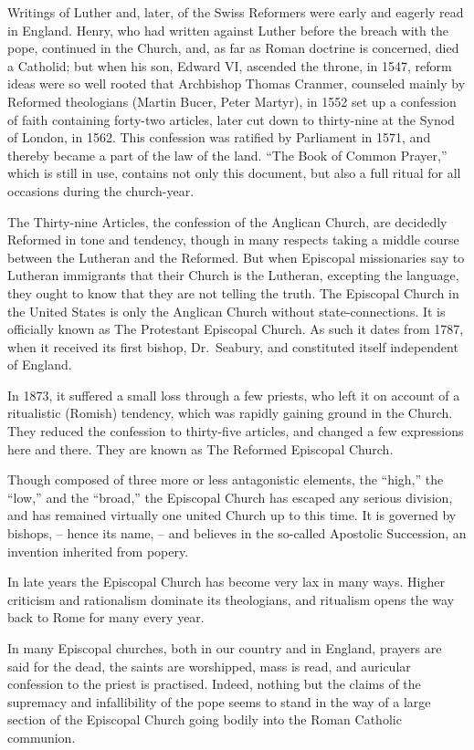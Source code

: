 \documentclass[
]{book}
\begin{document}
Writings of Luther and, later, of the Swiss Reformers were early and eagerly read in England. Henry, who had written against Luther before the breach with the pope, continued in the Church, and, as far as Roman doctrine is concerned, died a Catholid; but when his son, Edward VI, ascended the throne, in 1547, reform ideas were so well rooted that Archbishop Thomas Cranmer, counseled mainly by Reformed theologians (Martin Bucer, Peter Martyr), in 1552 set up a confession of faith containing forty-two articles, later cut down to thirty-nine at the Synod of London, in 1562. This confession was ratified by Parliament in 1571, and thereby became a part of the law of the land. ``The Book of Common Prayer,'' which is still in use, contains not only this document, but also a full ritual for all occasions during the church-year.

The Thirty-nine Articles, the confession of the Anglican Church, are decidedly Reformed in tone and tendency, though in many respects taking a middle course between the Lutheran and the Reformed. But when Episcopal missionaries say to Lutheran immigrants that their Church is the Lutheran, excepting the language, they ought to know that they are not telling the truth. The Episcopal Church in the United States is only the Anglican Church without state-connections. It is officially known as The Protestant Episcopal Church. As such it dates from 1787, when it received its first bishop, Dr.~Seabury, and constituted itself independent of England.

In 1873, it suffered a small loss through a few priests, who left it on account of a ritualistic (Romish) tendency, which was rapidly gaining ground in the Church. They reduced the confession to thirty-five articles, and changed a few expressions here and there. They are known as The Reformed Episcopal Church.

Though composed of three more or less antagonistic elements, the ``high,'' the ``low,'' and the ``broad,'' the Episcopal Church has escaped any serious division, and has remained virtually one united Church up to this time. It is governed by bishops, -- hence its name, -- and believes in the so-called Apostolic Succession, an invention inherited from popery.

In late years the Episcopal Church has become very lax in many ways. Higher criticism and rationalism dominate its theologians, and ritualism opens the way back to Rome for many every year.

In many Episcopal churches, both in our country and in England, prayers are said for the dead, the saints are worshipped, mass is read, and auricular confession to the priest is practised. Indeed, nothing but the claims of the supremacy and infallibility of the pope seems to stand in the way of a large section of the Episcopal Church going bodily into the Roman Catholic communion.
\end{document}
